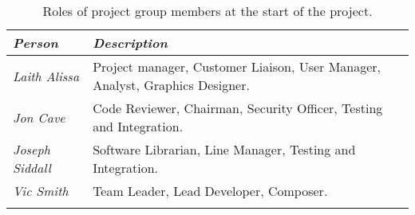 \begin{table*}[h!]
	\begin{tabular}{l p{38em}}
		\toprule
		\emph{Person} & \emph{Description} \\
		\midrule
		\emph{Laith Alissa} & Project manager, Customer Liaison, User Manager, Analyst, Graphics Designer.\\[0.5em]
		\emph{Jon Cave} & Code Reviewer, Chairman, Security Officer, Testing and Integration.\\[0.5em]
		\emph{Joseph Siddall} & Software Librarian, Line Manager, Testing and Integration.\\[0.5em]
		\emph{Vic Smith} & Team Leader, Lead Developer, Composer.\\[0.5em]
		\bottomrule
		\caption{Roles of project group members at the start of the project.}
	\end{tabular}
	\label{tab:roles}
\end{table*}